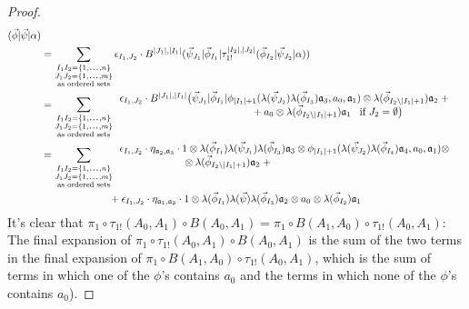 \begin{proof}
\begin{align*}
  (\vec{\phi} | \vec{\psi} | \alpha ) \\
&=
\sum \limits_{\substack{
  I_1I_2 = \{1,\smdots,n\}\\
  J_1J_2 = \{1,\smdots,m\}\\
  \textrm{as ordered sets}}}
\epsilon_{I_1,J_2} \cdot
B^{|J_1|, |I_1|} (\vec{\psi}_{J_1} | \vec{\phi}_{I_1} | 
  \tau_{1!}^{|I_2|, |J_2|} (\vec{\phi}_{I_2} | \vec{\psi}_{J_2} | \alpha)) \\
&= 
\sum \limits_{\substack{
  I_1I_2 = \{1,\smdots,n\}\\
  J_1J_2 = \{1,\smdots,m\}\\
  \textrm{as ordered sets}}}
\begin{array}{l}{}
\epsilon_{I_1,J_2} \cdot
B^{|J_1|, |I_1|} \big(\vec{\psi}_{J_1} | \vec{\phi}_{I_1} | \phi_{|I_1|+1} (
  \lambda(\vec{\psi}_{J_2}) \lambda(\vec{\phi}_{I_3}) 
  \mathfrak{a}_3, a_0, \mathfrak{a}_1) \otimes 
  \lambda(\vec{\phi}_{I_2 \backslash |I_1| + 1}) 
  \mathfrak{a}_2 \; + \\
\hphantom{{}moveovermoveovermoveover{}} 
  + a_0 \otimes \lambda(\vec{\phi}_{I_2 \backslash |I_1| + 1}) 
  \mathfrak{a}_1 \; \; \; 
  \text{if }J_2 = \emptyset \big)
\end{array} \\
&= 
\sum \limits_{\substack{
  I_1I_2 = \{1,\smdots,n\}\\
  J_1J_2 = \{1,\smdots,m\}\\
  \textrm{as ordered sets}}}
\begin{array}{l}  
\epsilon_{I_1,J_2} \cdot  
\eta_{\mathfrak{a}_2,\mathfrak{a}_3} \cdot  
1 \otimes \lambda(\vec{\phi}_{I_1}) \lambda(\vec{\psi}_{J_1}) 
  \lambda(\vec{\phi}_{I_3}) \mathfrak{a}_3 \otimes 
  \phi_{|I_1|+1} (\lambda(\vec{\psi}_{J_2}) \lambda(\vec{\phi}_{I_4}) 
  \mathfrak{a}_4, a_0, \mathfrak{a}_1) \otimes \\
  \phantom{{}moveovermov{}}\otimes 
  \lambda(\vec{\phi}_{I_2 \backslash |I_1| + 1}) 
  \mathfrak{a}_2 \; + 
\end{array}\\
&\hphantom{{}moveovermove{}} 
  +\epsilon_{I_1,J_2} \cdot  
  \eta_{\mathfrak{a}_1,\mathfrak{a}_2} \cdot  
  1 \otimes \lambda(\vec{\phi}_{I_1}) \lambda(\vec{\psi}) 
  \lambda(\vec{\phi}_{I_3}) \mathfrak{a}_2 \otimes 
  a_0 \otimes \lambda(\vec{\phi}_{I_2}) \mathfrak{a}_1
\end{align*}
%
It's clear that $\pi_1 \circ \tau_{1!}(A_0,A_1) 
\circ B(A_0,A_1) =  \pi_1 \circ B(A_1,A_0) 
\circ \tau_{1!}(A_0,A_1)$: The final expansion of 
$\pi_1 \circ \tau_{1!}(A_0,A_1) \circ B(A_0,A_1)$ 
is the sum of the two terms in the final expansion 
of $\pi_1 \circ B(A_1,A_0) \circ \tau_{1!}(A_0,A_1)$, 
which is the sum of terms in which one of 
the $\phi$'s contains $a_0$ and the terms in which 
none of the $\phi$'s contains $a_0$).
\end{proof}